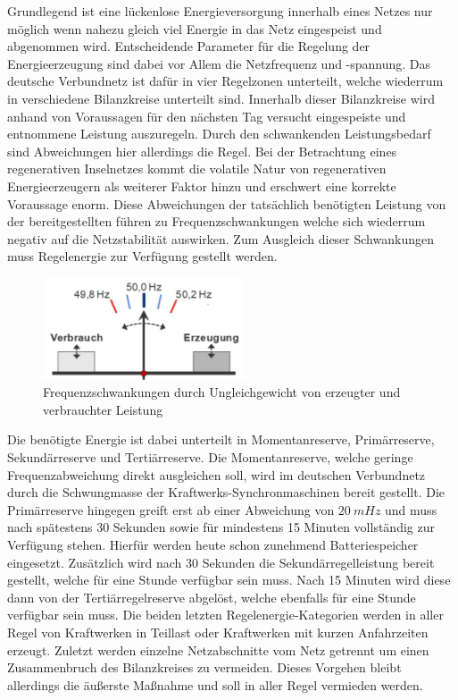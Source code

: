 Grundlegend ist eine lückenlose Energieversorgung innerhalb eines Netzes nur möglich wenn nahezu gleich viel Energie in das Netz
eingespeist und abgenommen wird.
Entscheidende Parameter für die Regelung der Energieerzeugung sind dabei vor Allem die Netzfrequenz 
und -spannung.
Das deutsche Verbundnetz ist dafür in vier Regelzonen unterteilt, welche wiederrum in verschiedene
Bilanzkreise unterteilt sind.
Innerhalb dieser Bilanzkreise wird anhand von Voraussagen für den nächsten Tag versucht
eingespeiste und entnommene Leistung auszuregeln.
Durch den schwankenden Leistungsbedarf sind Abweichungen hier allerdings die Regel.
Bei der Betrachtung eines regenerativen Inselnetzes kommt die volatile Natur von regenerativen Energieerzeugern
als weiterer Faktor hinzu und erschwert eine korrekte Voraussage enorm.
Diese Abweichungen der tatsächlich benötigten Leistung von der bereitgestellten führen zu Frequenzschwankungen
welche sich wiederrum negativ auf die Netzstabilität auswirken.
Zum Ausgleich dieser Schwankungen muss Regelenergie zur Verfügung gestellt werden.

\begin{figure}[h!]
    \centering
    \includegraphics[width=6cm]{Abbildungen/Sollfrequenz.png}
    \caption{Frequenzschwankungen durch Ungleichgewicht von erzeugter und verbrauchter Leistung~\parencite{cronenberg_beschreibung_nodate}}\label{Gleichgewicht}
\end{figure}

Die benötigte Energie ist dabei unterteilt in Momentanreserve, Primärreserve, Sekundärreserve 
und Tertiärreserve.
Die Momentanreserve, welche geringe Frequenzabweichung direkt ausgleichen soll, wird im deutschen Verbundnetz
durch die Schwungmasse der Kraftwerks-Synchronmaschinen bereit gestellt.
Die Primärreserve hingegen greift erst ab einer Abweichung von $20\ mHz$ und muss nach spätestens 30 Sekunden
sowie für mindestens 15 Minuten vollständig zur Verfügung stehen.
Hierfür werden heute schon zunehmend Batteriespeicher eingesetzt.
Zusätzlich wird nach 30 Sekunden die Sekundärregelleistung bereit gestellt, welche für eine Stunde verfügbar sein muss.
Nach 15 Minuten wird diese dann von der Tertiärregelreserve abgelöst, welche ebenfalls für eine Stunde verfügbar sein muss.
Die beiden letzten Regelenergie-Kategorien werden in aller Regel von Kraftwerken in Teillast oder Kraftwerken mit kurzen Anfahrzeiten
erzeugt.
Zuletzt werden einzelne Netzabschnitte vom Netz getrennt um einen Zusammenbruch des Bilanzkreises zu vermeiden.
Dieses Vorgehen bleibt allerdings die äußerste Maßnahme und soll in aller Regel vermieden werden.

